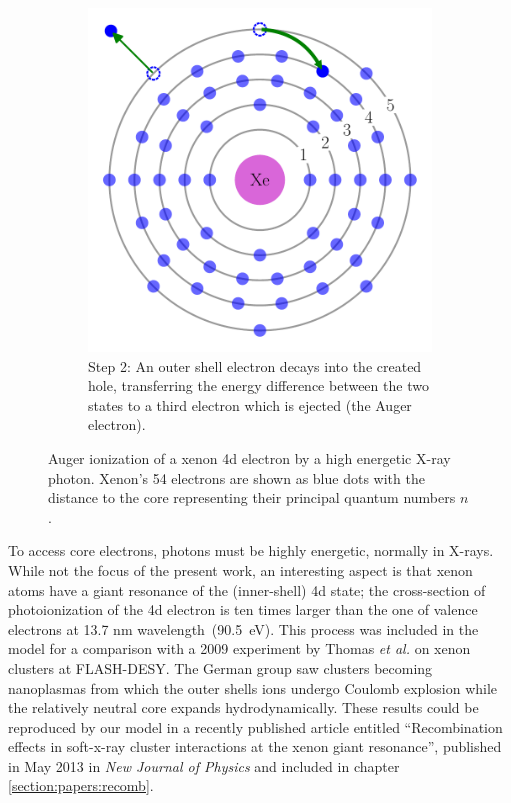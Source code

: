 \begin{figure}
\begin{subfigure}[t]{0.45\columnwidth}
        \includegraphics[width=\textwidth]{figures/auger_step_2}
        \caption{Step 2: An outer shell electron decays into the created hole,
                 transferring the energy difference between the two states to a
                 third electron which is ejected (the Auger electron).}
        \label{fig:auger:2}
    \end{subfigure}
        \caption{\label{fig:auger}Auger ionization of a xenon 4d electron by a
                 high energetic X-ray photon. Xenon's 54 electrons are shown
                 as blue dots with the distance to the core representing their
                 principal quantum numbers $n$.}
\end{figure}

To access core electrons, photons must be highly energetic, normally in X-rays.
While not the focus of the present work, an interesting aspect is that xenon
atoms have a giant resonance of the (inner-shell) 4d state; the cross-section of
photoionization of the 4d electron is ten times larger than the
one of valence  electrons at 13.7 nm wavelength~(90.5~eV)\cite{Becker1986}.
This process was included in the model for a comparison with a 2009 experiment
by Thomas \textit{et al.}\cite{Thomas2009} on xenon clusters at FLASH-DESY.
The German group saw clusters becoming nanoplasmas from which the outer shells
ions undergo Coulomb explosion while the relatively neutral core expands
hydrodynamically. These results could be reproduced by our model in a recently
published article entitled ``Recombination effects in soft-x-ray cluster
interactions at the xenon giant resonance'', published in May 2013 in
\textit{New Journal of Physics}\cite{Ackad2013} and included in chapter
\ref{section:papers:recomb}.


